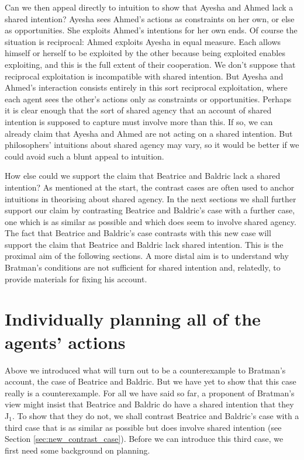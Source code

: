 \documentclass[12pt,\papersize]{extarticle}
\begin{document}
Can we then appeal directly to intuition to show that Ayesha and Ahmed lack a shared intention?
Ayesha sees Ahmed's actions as constraints on her own, or else as opportunities.
She exploits Ahmed's intentions for her own ends.
Of course the situation is reciprocal: Ahmed exploits Ayesha in equal measure.
Each allows himself or herself to be exploited by the other because being exploited enables exploiting,
and this is the full extent of their cooperation. 
We don't suppose that reciprocal exploitation is incompatible with shared intention. 
But Ayesha and Ahmed's interaction consists entirely in this sort reciprocal exploitation, where each agent sees the other's actions only as constraints or opportunities.
Perhaps it is clear enough that 
the sort of shared agency that an account of shared intention is supposed to capture must involve more than this. 
If so, we can already claim that Ayesha and Ahmed are not acting on a shared intention.
But philosophers' intuitions about shared agency may vary, so it would be better if we could avoid such a blunt appeal to intuition.

How else could we support the claim that Beatrice and Baldric lack a shared intention? 
As mentioned at the start, 
the contrast cases are often used to anchor intuitions in theorising about shared agency.
In the next sections we shall further support our claim by contrasting Beatrice and Baldric's case with a further case, one which is as similar as possible and which does seem to involve shared agency.
The fact that Beatrice and Baldric's case contrasts with this new case will support the claim that Beatrice and Baldric lack shared intention.
This is the proximal aim of the following sections.
A more distal aim 
is to understand why Bratman's conditions are not sufficient for shared intention
and, relatedly, to provide materials for fixing his account.



\section{Individually planning all of  the agents' actions}
\label{sec:distributed_plan}

Above we introduced what will turn out to be a counterexample to Bratman's account, the case of Beatrice and Baldric. 
But we have yet to show that this case really is a counterexample. 
For all we have said so far, a proponent of Bratman's view might insist that Beatrice and Baldric do have a shared intention that they J$_1$.
To show that they do not,
we shall contrast Beatrice and Baldric's case with a third case that is as similar as possible but does involve shared intention (see Section \vref{sec:new_contrast_case}). 
Before we can introduce this third case,
we first need some background on planning.
\end{document}
